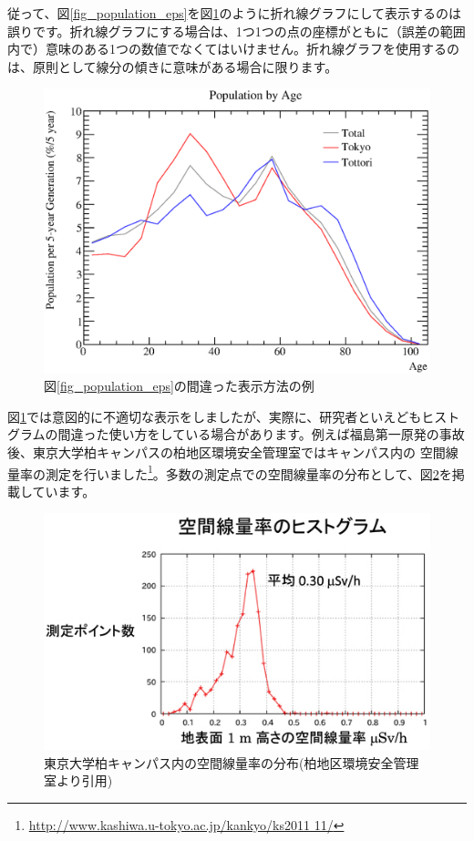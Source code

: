 従って、図\ref{fig_population_eps}を図\ref{fig_population2_eps}のように折れ線グラフにして表示するのは誤りです。折れ線グラフにする場合は、1つ1つの点の座標がともに（誤差の範囲内で）意味のある1つの数値でなくてはいけません。折れ線グラフを使用するのは、原則として線分の傾きに意味がある場合に限ります。

\begin{figure}
  \centering
  \includegraphics[width=12cm,clip]{fig/population2.eps}
  \caption{図\ref{fig_population_eps}の間違った表示方法の例}
  \label{fig_population2_eps}
\end{figure}

図\ref{fig_population2_eps}では意図的に不適切な表示をしましたが、実際に、研究者といえどもヒストグラムの間違った使い方をしている場合があります。例えば福島第一原発の事故後、東京大学柏キャンパスの柏地区環境安全管理室ではキャンパス内の 空間線量率の測定を行いました\footnote{\url{http://www.kashiwa.u-tokyo.ac.jp/kankyo/ks2011 11/}}。多数の測定点での空間線量率の分布として、図\ref{fig_Kashiwa_png}を掲載しています。

\begin{figure}
  \centering
  \includegraphics[scale=0.8,bb= 0 0 485 297]{fig/Kashiwa.png}
  \caption{東京大学柏キャンパス内の空間線量率の分布(柏地区環境安全管理室より引用)}
  \label{fig_Kashiwa_png}
\end{figure}

